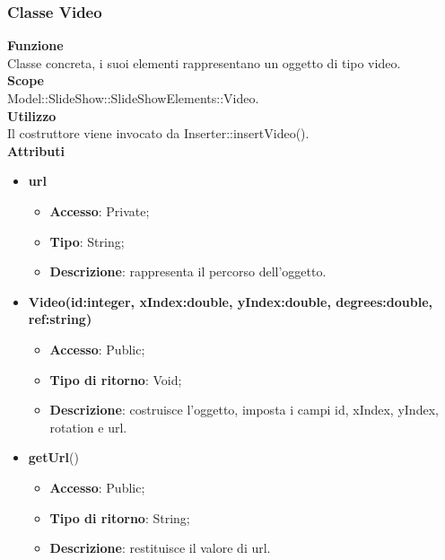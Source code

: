 {	\subsubsection{Classe Video}{
		\label{Video}
		\textbf{Funzione}\\
			\indent Classe concreta, i suoi elementi rappresentano un oggetto di tipo video.\\
	   	\textbf{Scope}\\
			\indent Model::SlideShow::SlideShowElements::Video.\\
		\textbf{Utilizzo}\\
			\indent Il costruttore viene invocato da Inserter::insertVideo().\\
		\textbf{Attributi}
		\begin{itemize}
			\item \textbf{url}
			\begin{itemize}
				\item \textbf{Accesso}: Private;
				\item \textbf{Tipo}: String;
				\item \textbf{Descrizione}: rappresenta il percorso dell’oggetto.
			\end{itemize}
		\end{itemize}
		\begin{itemize}
			\item \textbf{Video(id:integer, xIndex:double, yIndex:double, degrees:double, ref:string)}
			\begin{itemize}
				\item \textbf{Accesso}: Public;
				\item \textbf{Tipo di ritorno}: Void;
				\item \textbf{Descrizione}: costruisce l’oggetto, imposta i campi id, xIndex, yIndex, rotation e url.
			\end{itemize}
			\item \textbf{getUrl}()
			\begin{itemize}
				\item \textbf{Accesso}: Public;
				\item \textbf{Tipo di ritorno}: String;
				\item \textbf{Descrizione}: restituisce il valore di url.
			\end{itemize}
		\end{itemize}
		}

}
